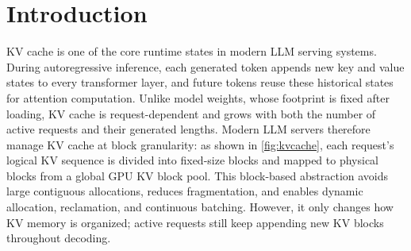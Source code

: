 \documentclass[sigplan,10pt,review,anonymous]{acmart}
\begin{document}



\maketitle

\section{Introduction}
\label{sec:intro}

KV cache is one of the core runtime states in modern LLM serving systems.
During autoregressive inference, each generated token appends new key and value states to every transformer layer, and future tokens reuse these historical states for attention computation.
Unlike model weights, whose footprint is fixed after loading, KV cache is request-dependent and grows with both the number of active requests and their generated lengths.
Modern LLM servers therefore manage KV cache at block granularity: as shown in \autoref{fig:kvcache}, each request's logical KV sequence is divided into fixed-size blocks and mapped to physical blocks from a global GPU KV block pool.
This block-based abstraction avoids large contiguous allocations, reduces fragmentation, and enables dynamic allocation, reclamation, and continuous batching.
However, it only changes how KV memory is organized; active requests still keep appending new KV blocks throughout decoding.
\end{document}
